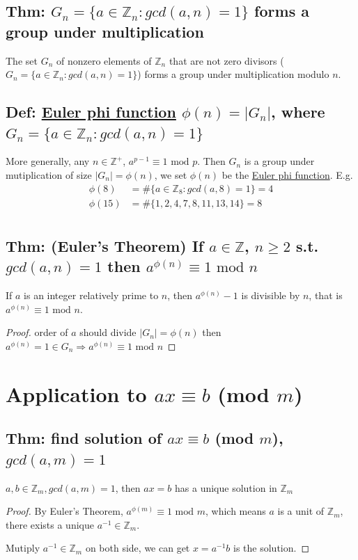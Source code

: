 \documentclass[11pt]{elegantbook}
\begin{document}
\subsection{Thm: $G_n=\{a\in \mathbb{Z}_n: gcd(a,n)=1\}$ forms a group under multiplication}
\begin{theorem}
    The set $G_n$ of nonzero elements of $\mathbb{Z}_n$ that are not zero divisors ($G_n=\{a\in \mathbb{Z}_n: gcd(a,n)=1\}$) forms a group under multiplication modulo $n$.
\end{theorem}
\subsection{Def: \underline{Euler phi function} $\phi(n)=|G_n|$, where $G_n=\{a\in \mathbb{Z}_n: gcd(a,n)=1\}$}
More generally, any $n\in \mathbb{Z}^+$, $a^{p-1}\equiv 1 \text{ mod } p$. Then $G_n$ is a group under mutiplication of size $|G_n|=\phi(n)$, we set $\phi(n)$ be the \underline{Euler phi function}.
E.g. 
\begin{equation}
    \begin{aligned}
        \phi(8)&=\#\{a\in \mathbb{Z}_8: gcd(a,8)=1\}=4\\
        \phi(15)&=\#\{1,2,4,7,8,11,13,14\}=8\\
    \end{aligned}
    \nonumber
\end{equation}

\subsection{Thm: (Euler's Theorem) If $a\in \mathbb{Z}$, $n\geq 2$ s.t. $gcd(a,n)=1$ then $a^{\phi(n)}\equiv 1 \text{ mod }n$}
\begin{theorem}
    If $a$ is an integer relatively prime to $n$, then $a^{\phi(n)} - 1$ is divisible
    by $n$, that is $a^{\phi(n)}\equiv 1 \text{ mod }n$.
\end{theorem}
\begin{proof}
    order of $a$ should divide $|G_n|=\phi(n)$ then $a^{\phi(n)}=1\in G_n \Rightarrow a^{\phi(n)}\equiv 1 \text{ mod }n$
\end{proof}

\section{Application to $ax \equiv b$ (mod $m$)}
\subsection{Thm: find solution of $ax \equiv b$ (mod $m$), $gcd(a,m)=1$}
\begin{theorem}
    $a,b\in \mathbb{Z}_m, gcd(a,m)=1$, then $ax=b$ has a unique solution in $\mathbb{Z}_m$
\end{theorem}
\begin{proof}
By Euler's Theorem, $a^{\phi(m)}\equiv 1 \text{ mod }m$, which means $a$ is a unit of $\mathbb{Z}_m$, there exists a unique $a^{-1}\in \mathbb{Z}_m$.

Mutiply $a^{-1}\in \mathbb{Z}_m$ on both side, we can get $x=a^{-1}b$ is the solution.
\end{proof}
\end{document}

